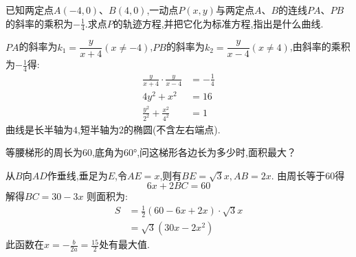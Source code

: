 \begin{questions}
\begin{solution}
\begin{enumerate}[label=\Roman*.]
		\end{enumerate}
	\end{solution}

	\question
	已知两定点$A(-4,0)$、$B(4,0)$,一动点$P(x,y)$与两定点$A$、$B$的连线$PA$、$PB$的斜率的乘积为$-\frac14$.求点$P$的轨迹方程,并把它化为标准方程,指出是什么曲线.
	\begin{solution}
		$PA$的斜率为$k_1 = \dfrac{y}{x+4}(x \neq -4)$,$PB$的斜率为$k_2 = \dfrac{y}{x-4}(x \neq 4)$,由斜率的乘积为$-\frac14$得:
		\begin{align*}
			\frac{y}{x+4}\cdot\frac{y}{x-4}   & = -\frac14 \\
			4y^2 + x^2                        & = 16       \\
			\frac{y^2}{2^2} + \frac{x^2}{4^2} & = 1
		\end{align*}
		曲线是长半轴为$4$,短半轴为$2$的椭圆(不含左右端点).
	\end{solution}

	\question 等腰梯形的周长为$60$,底角为\ang{60},问这梯形各边长为多少时,面积最大？
	\begin{figure*}[ht]
		\centering
	\end{figure*}

	\begin{solution}
		从$B$向$AD$作垂线,垂足为$E$,令$AE=x$,则有$BE=\sqrt{3}x, AB=2x$.
		由周长等于$60$得
		\begin{equation*}
			6x + 2BC = 60
		\end{equation*}
		解得$BC = 30 - 3x$
		则面积为:
		\begin{align*}
			S & = \frac12(60-6x + 2x)\cdot\sqrt{3}x \\
			  & = \sqrt{3}(30x - 2x^2)
		\end{align*}
		此函数在$x=-\frac{b}{2a} = \frac{15}{2}$处有最大值.


\end{solution}
\end{questions}
